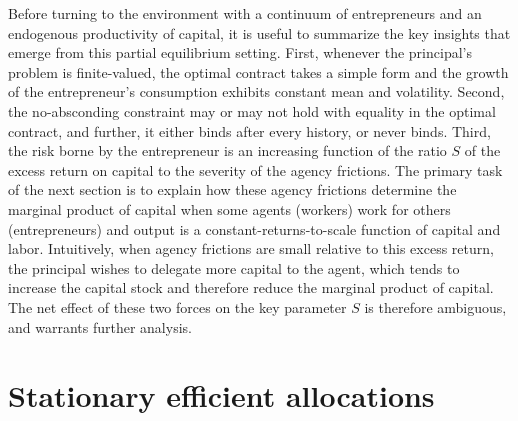 \documentclass[11pt]{article}
\theoremstyle{plain}
\theoremstyle{definition} %
\begin{document}
Before turning to the environment with a continuum of entrepreneurs and an endogenous productivity of capital, it is useful to summarize the key insights that emerge from this partial equilibrium setting. First, whenever the principal's problem is finite-valued, the optimal contract takes a simple form and the growth of the entrepreneur's consumption exhibits constant mean and volatility. Second, the no-absconding constraint may or may not hold with equality in the optimal contract, and further, it either binds after every history, or never binds. Third, the risk borne by the entrepreneur is an increasing function of the ratio $S$ of the excess return on capital to the severity of the agency frictions. The primary task of the next section is to explain how these agency frictions determine the marginal product of capital when some agents (workers) work for others (entrepreneurs) and output is a constant-returns-to-scale function of capital and labor. Intuitively, when agency frictions are small relative to this excess return, the principal wishes to delegate more capital to the agent, which tends to increase the capital stock and therefore reduce the marginal product of capital. The net effect of these two forces on the key parameter $S$ is therefore ambiguous, and warrants further analysis.

\section{Stationary efficient allocations} \label{STATsection}
\end{document}
